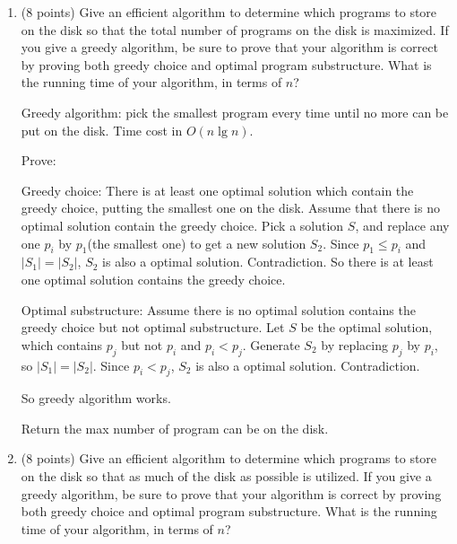 \documentclass[paper=a4, fontsize=11pt]{scrartcl} %
\begin{document}
\begin{enumerate}
\item
  \begin{fancyquotes}
    (8 points) Give an efficient algorithm to determine which programs
    to store on the disk so that the total number of programs on the
    disk is maximized. If you give a greedy algorithm, be sure to
    prove that your algorithm is correct by proving both greedy choice
    and optimal program substructure. What is the running time of
    your algorithm, in terms of $n$?
  \end{fancyquotes}

  Greedy algorithm: pick the smallest program every time until no more
  can be put on the disk. Time cost in $O(n\lg{n})$.

  Prove:

  Greedy choice:
  There is at least one optimal solution which contain the greedy
  choice, putting the smallest one on the disk. Assume that there is
  no optimal solution contain the greedy choice. Pick a solution $S$,
  and replace any one $p_i$ by $p_1$(the smallest one) to get a new
  solution $S_2$. Since $p_1\leq p_i$ and $|S_1| = |S_2|$, $S_2$ is
  also a optimal solution. Contradiction. So there is at least one
  optimal solution contains the greedy choice.

  Optimal substructure:
  Assume there is no optimal solution contains the greedy choice but
  not optimal substructure.
  Let $S$ be the optimal solution, which contains $p_j$ but not $p_i$
  and $p_i<p_j$. Generate $S_2$ by replacing $p_j$ by $p_i$, so
  $|S_1|=|S_2|$. Since $p_i<p_j$, $S_2$ is also a optimal
  solution. Contradiction.

  So greedy algorithm works.

  \begin{algorithm}[H]
    \caption{Return the max number of program can be on the disk.}
  \end{algorithm}


\item
  \begin{fancyquotes}
    (8 points) Give an efficient algorithm to determine which
    programs to store on the disk so that as much of the disk as
    possible is utilized. If you give a greedy algorithm, be sure to
    prove that your algorithm is correct by proving both greedy
    choice and optimal program substructure. What is the running time
    of your algorithm, in terms of $n$?
  \end{fancyquotes}


\end{enumerate}
\end{document}
